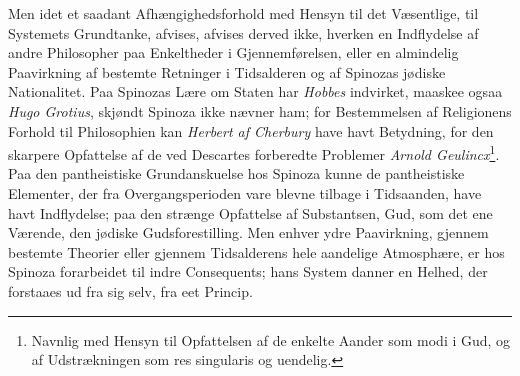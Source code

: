 \documentclass[12pt,a4paper]{book}
\begin{document}
Men idet et saadant Afhængighedsforhold med Hensyn til det Væsentlige,
til Systemets Grundtanke, afvises, afvises derved ikke, hverken en
Indflydelse af andre Philosopher paa Enkeltheder i Gjennemførelsen, eller
en almindelig Paavirkning af bestemte Retninger i Tidsalderen og af
Spinozas jødiske Nationalitet. Paa Spinozas Lære om Staten har
\emph{Hobbes} indvirket, maaskee ogsaa \emph{Hugo Grotius}, skjøndt
Spinoza ikke nævner ham; for Bestemmelsen af Religionens Forhold til
Philosophien kan \emph{Herbert af Cherbury} have havt Betydning, for den
skarpere Opfattelse af de ved Descartes forberedte Problemer
\emph{Arnold Geulincx}\footnote{Navnlig med Hensyn til Opfattelsen af de
enkelte Aander som modi i Gud, og af Udstrækningen som res singularis og
uendelig.}. Paa den pantheistiske Grundanskuelse hos Spinoza kunne de
pantheistiske Elementer, der fra Overgangsperioden vare blevne tilbage i
Tidsaanden, have havt Indflydelse; paa den strænge Opfattelse af
Substantsen, Gud, som det ene Værende, den jødiske Gudsforestilling. Men
enhver ydre Paavirkning, gjennem bestemte Theorier eller gjennem
Tidsalderens hele aandelige Atmosphære, er hos Spinoza forarbeidet til
indre Consequents; hans System danner en Helhed, der forstaaes ud fra sig
selv, fra eet Princip.
\end{document}
